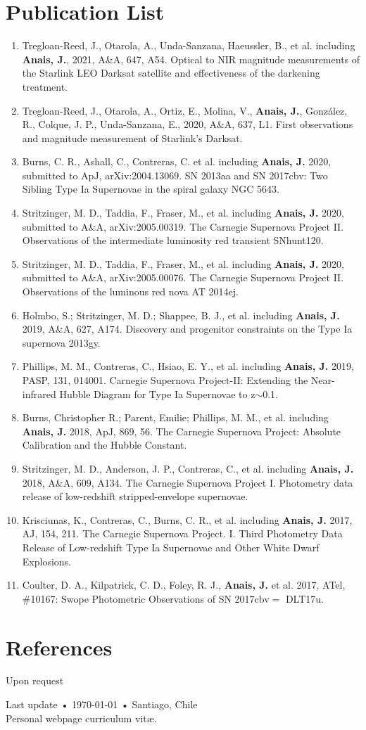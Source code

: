 \documentclass[11pt, a4paper]{article}
\begin{document}
\section*{Publication List}
\begin{enumerate}
  \item Tregloan-Reed, J., Otarola, A., Unda-Sanzana, Haeussler, B., et al. including \textbf{Anais, J.}, 2021, A\&A, 647, A54. Optical to NIR magnitude measurements of the Starlink LEO Darksat satellite and effectiveness of the darkening treatment.
  \item Tregloan-Reed, J., Otarola, A., Ortiz, E., Molina, V., \textbf{Anais, J.}, González, R., Colque, J. P., Unda-Sanzana, E., 2020, A\&A, 637, L1. First observations and magnitude measurement of Starlink's Darksat.
  \item Burns, C. R., Ashall, C., Contreras, C.  et al. including \textbf{Anais, J.} 2020, submitted to ApJ, arXiv:2004.13069. SN 2013aa and SN 2017cbv: Two Sibling Type Ia Supernovae in the spiral galaxy NGC 5643.
  \item Stritzinger, M. D., Taddia, F., Fraser, M., et al. including \textbf{Anais, J.} 2020, submitted to A\&A, arXiv:2005.00319.  The Carnegie Supernova Project II. Observations of the intermediate luminosity red transient SNhunt120.
  \item Stritzinger, M. D., Taddia, F., Fraser, M., et al. including \textbf{Anais, J.} 2020, submitted to A\&A, arXiv:2005.00076. The Carnegie Supernova Project II. Observations of the luminous red nova AT 2014ej.
  \item Holmbo, S.; Stritzinger, M. D.; Shappee, B. J., et al. including \textbf{Anais, J.} 2019, A\&A, 627, A174. Discovery and progenitor constraints on the Type Ia supernova 2013gy.
  \item Phillips, M. M., Contreras, C., Hsiao, E. Y., et al. including \textbf{Anais, J.} 2019, PASP, 131, 014001. Carnegie Supernova Project-II: Extending the Near-infrared Hubble Diagram for Type Ia Supernovae to z$\sim$0.1.
  \item Burns, Christopher R.; Parent, Emilie; Phillips, M. M., et al. including \textbf{Anais, J.} 2018, ApJ, 869, 56. The Carnegie Supernova Project: Absolute Calibration and the Hubble Constant.
  \item Stritzinger, M. D., Anderson, J. P., Contreras, C., et al. including \textbf{Anais, J.} 2018, A\&A, 609, A134. The Carnegie Supernova Project I. Photometry data release of low-redshift stripped-envelope supernovae.
  \item Krisciunas, K., Contreras, C., Burns, C. R., et al. including \textbf{Anais, J.} 2017, AJ, 154, 211. The Carnegie Supernova Project. I. Third Photometry Data Release of Low-redshift Type Ia Supernovae and Other White Dwarf Explosions.
  \item Coulter, D. A., Kilpatrick, C. D., Foley, R. J., \textbf{Anais, J.} et al. 2017, ATel, \#10167: Swope Photometric Observations of SN 2017cbv$=$ DLT17u.
\end{enumerate}

\section*{References}
Upon request

\vspace{1cm}
\begin{center}
{\small Last update\- •\- \today\- •\- Santiago, Chile}\\
{\scriptsize  Personal webpage curriculum vit\ae.}
\end{center}
\end{document}
